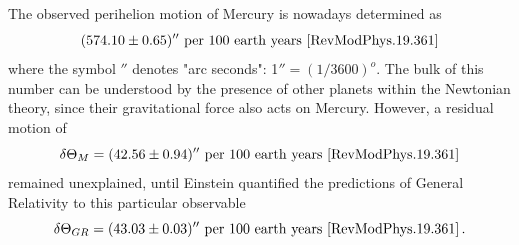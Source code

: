 \documentclass[12pt,ngerman,american]{iopart}
\begin{document}
The observed perihelion motion of Mercury is nowadays determined as
\[(574.10\pm 0.65)'' \ \mbox{per 100 earth years \cite{RevModPhys.19.361}}\]
where the symbol $''$ denotes "arc seconds": 1$''={(1/3600)}^o$. The bulk of this number
can be understood by the presence of other planets within the Newtonian theory, since
their gravitational force also acts on Mercury. However, a
residual motion of
\begin{equation}
\delta \Theta_M = (42.56\pm 0.94)'' \ \mbox{per 100 earth years \cite{RevModPhys.19.361}} \label{delT}
\end{equation}
remained unexplained, until Einstein quantified the predictions of General Relativity to this particular observable \cite{Einstein}
\begin{equation}
\delta \Theta_{GR} = (43.03\pm 0.03)'' \ \mbox{per 100 earth years \cite{RevModPhys.19.361}} \label{delTGR} \, .
\end{equation}
\end{document}
